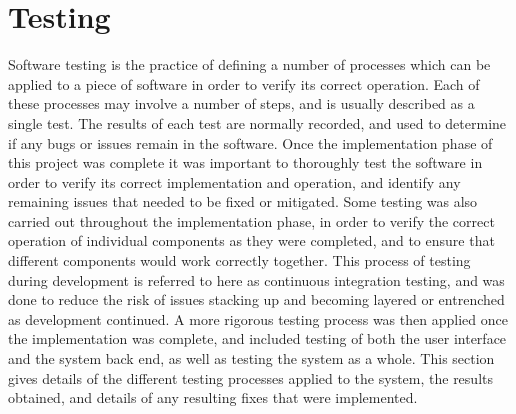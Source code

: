 
\chapter[Testing]{Testing} %

\label{Chapter10} %


Software testing is the practice of defining a number of processes which can be applied to a piece of software in order to verify its correct operation. Each of these processes may involve a number of steps, and is usually described as a single test. The results of each test are normally recorded, and used to determine if any bugs or issues remain in the software. Once the implementation phase of this project was complete it was important to thoroughly test the software in order to verify its correct implementation and operation, and identify any remaining issues that needed to be fixed or mitigated. Some testing was also carried out throughout the implementation phase, in order to verify the correct operation of individual components as they were completed, and to ensure that different components would work correctly together. This process of testing during development is referred to here as continuous integration testing, and was done to reduce the risk of issues stacking up and becoming layered or entrenched as development continued. A more rigorous testing process was then applied once the implementation was complete, and included testing of both the user interface and the system back end, as well as testing the system as a whole. 
This section gives details of the different testing processes applied to the system, the results obtained, and details of any resulting fixes that were implemented.


